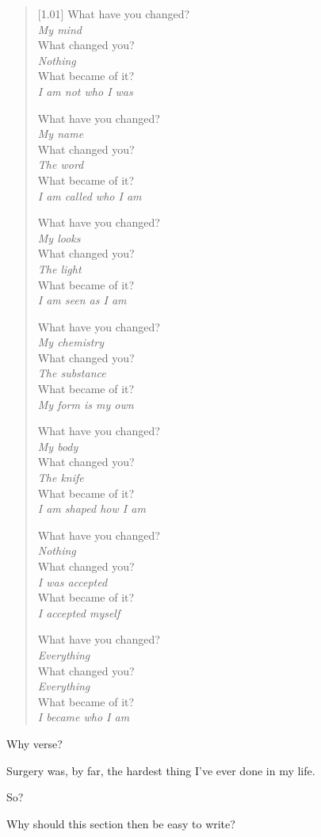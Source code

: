 \begin{verse}[1.01\textwidth]
What have you changed?\\
\vin \emph{My mind}\\
What changed you?\\
\vin \emph{Nothing}\\
What became of it?\\
\vin \emph{I am not who I was}

What have you changed?\\
\vin \emph{My name}\\
What changed you?\\
\vin \emph{The word}\\
What became of it?\\
\vin \emph{I am called who I am}

What have you changed?\\
\vin \emph{My looks}\\
What changed you?\\
\vin \emph{The light}\\
What became of it?\\
\vin \emph{I am seen as I am}

What have you changed?\\
\vin \emph{My chemistry}\\
What changed you?\\
\vin \emph{The substance}\\
What became of it?\\
\vin \emph{My form is my own}

\newpage
\null
\vspace{0.01em}

What have you changed?\\
\vin \emph{My body}\\
What changed you?\\
\vin \emph{The knife}\\
What became of it?\\
\vin \emph{I am shaped how I am}

What have you changed?\\
\vin \emph{Nothing}\\
What changed you?\\
\vin \emph{I was accepted}\\
What became of it?\\
\vin \emph{I accepted myself}

What have you changed?\\
\vin \emph{Everything}\\
What changed you?\\
\vin \emph{Everything}\\
What became of it?\\
\vin \emph{I became who I am}
\end{verse}
\newpage

\null
\vfill
\begin{ally}
  Why verse?
\end{ally}
Surgery was, by far, the hardest thing I've ever done in my life.

\begin{ally}
  So?
\end{ally}
Why should this section then be easy to write?
\vfill
\newpage
